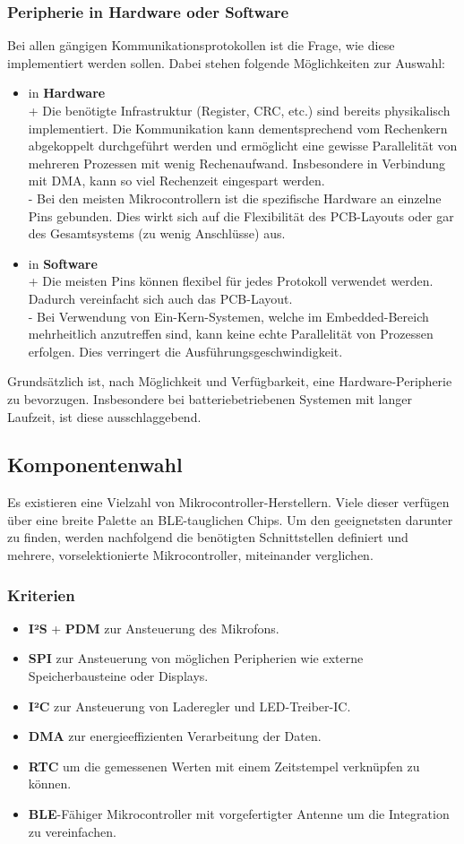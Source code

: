 \documentclass[12pt]{article}
\begin{document}
	\subsubsection*{Peripherie in Hardware oder Software}
	Bei allen gängigen Kommunikationsprotokollen ist die Frage, wie diese implementiert werden sollen. Dabei stehen folgende Möglichkeiten zur Auswahl:
	\begin{itemize}
		\item in \textbf{Hardware} \\
		+ Die benötigte Infrastruktur (Register, CRC, etc.) sind bereits physikalisch implementiert. Die Kommunikation kann dementsprechend vom Rechenkern abgekoppelt durchgeführt werden und ermöglicht eine gewisse Parallelität von mehreren Prozessen mit wenig Rechenaufwand. Insbesondere in Verbindung mit DMA, kann so viel Rechenzeit eingespart werden. \\
		- Bei den meisten Mikrocontrollern ist die spezifische Hardware an einzelne Pins gebunden. Dies wirkt sich auf die Flexibilität des PCB-Layouts oder gar des Gesamtsystems (zu wenig Anschlüsse) aus.
		\item in \textbf{Software} \\
		+ Die meisten Pins können flexibel für jedes Protokoll verwendet werden. Dadurch vereinfacht sich auch das PCB-Layout.\\
		- Bei Verwendung von Ein-Kern-Systemen, welche im Embedded-Bereich mehrheitlich anzutreffen sind, kann keine echte Parallelität von Prozessen erfolgen. Dies verringert die Ausführungsgeschwindigkeit.
	\end{itemize}
	Grundsätzlich ist, nach Möglichkeit und Verfügbarkeit, eine Hardware-Peripherie zu bevorzugen. Insbesondere bei batteriebetriebenen Systemen mit langer Laufzeit, ist diese ausschlaggebend.
	\subsection{Komponentenwahl}
	Es existieren eine Vielzahl von Mikrocontroller-Herstellern. Viele dieser verfügen über eine breite Palette an BLE-tauglichen Chips. Um den geeignetsten darunter zu finden, werden nachfolgend die benötigten Schnittstellen definiert und mehrere, vorselektionierte Mikrocontroller, miteinander verglichen.
	\subsubsection{Kriterien}
	\begin{itemize}
		\item \textbf{I²S} + \textbf{PDM} zur Ansteuerung des Mikrofons.
		\item \textbf{SPI} zur Ansteuerung von möglichen Peripherien wie externe Speicherbausteine oder Displays.
		\item \textbf{I²C} zur Ansteuerung von Laderegler und LED-Treiber-IC.
		\item \textbf{DMA} zur energieeffizienten Verarbeitung der Daten.
		\item \textbf{RTC} um die gemessenen Werten mit einem Zeitstempel verknüpfen zu können.
		\item \textbf{BLE}-Fähiger Mikrocontroller mit vorgefertigter Antenne um die Integration zu vereinfachen.
	\end{itemize}
\end{document}

